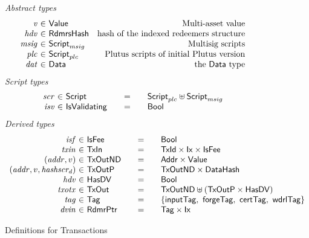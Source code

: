 \begin{figure*}[htb]
  \emph{Abstract types}
  \begin{equation*}
    \begin{array}{r@{~\in~}lr}
      \var{v} &\Value & \text{Multi-asset value}\\
      \var{hdv} &\RdmrsHash & \text{hash of the indexed redeemers structure}\\
      \var{msig} & \ScriptMSig & \text{Multisig scripts} \\
      \var{plc} & \ScriptPlutus & \text{Plutus scripts of initial Plutus version} \\
      \var{dat} & \Data & \text{the $\Data$ type} \\
    \end{array}
  \end{equation*}
  \emph{Script types}
  \begin{equation*}
    \begin{array}{r@{~\in~}l@{\qquad=\qquad}lr}
      \var{scr} & \Script & \ScriptPlutus \uniondistinct \ScriptMSig \\
      \var{isv} & \IsValidating & \Bool \\
    \end{array}
  \end{equation*}
%
  \emph{Derived types}
  \begin{equation*}
    \begin{array}{r@{~\in~}l@{\qquad=\qquad}lr}
      \var{isf}
      & \IsFee
      & \Bool
      \\
      \var{txin}
      & \TxIn
      & \TxId \times \Ix \times \IsFee
      \\
      (\var{addr}, v)
      & \type{TxOutND}
      & \Addr \times \Value
      \\
      (\var{addr}, v, \var{hashscr_d})
      & \type{TxOutP}
      & \type{TxOutND} \times \DataHash
      \\
      \var{hdv}
      & \HasDV
      & \Bool
      \\
      \var{txotx}
      & \TxOut
      & \TxOutND \uniondistinct (\TxOutP \times \HasDV)
      \\
      \var{tag}
      & \Tag
      & \{\mathsf{inputTag},~\mathsf{forgeTag},~\mathsf{certTag},~\mathsf{wdrlTag}\}
      \\
      \var{dvin}
      & \RdmrPtr
      & \Tag \times \Ix
    \end{array}
  \end{equation*}
  \caption{Definitions for Transactions}
  \label{fig:defs:utxo-shelley-1}
\end{figure*}


